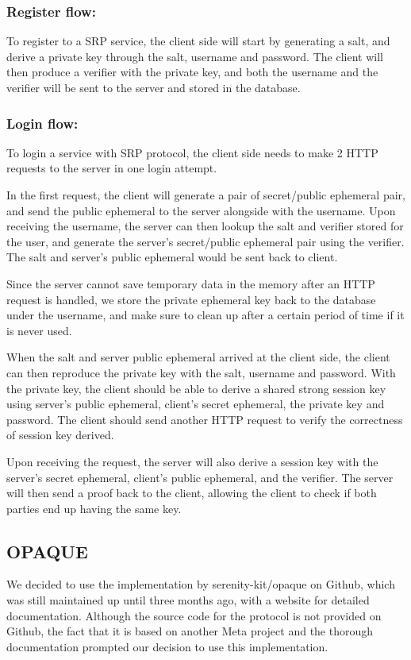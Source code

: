 \subsubsection{Register flow:}
To register to a SRP service, the client side will start by generating a salt, and derive a private key through the salt, username and password.
The client will then produce a verifier with the private key, and both the username and the verifier will be sent to the server and stored in the database.


\subsubsection{Login flow:}
To login a service with SRP protocol, the client side needs to make 2 HTTP requests to the server in one login attempt. 

In the first request, the client will generate a pair of secret/public ephemeral pair, and send the public ephemeral to the server alongside with the username.
Upon receiving the username, the server can then lookup the salt and verifier stored for the user, and generate the server's secret/public ephemeral pair using the verifier.
The salt and server's public ephemeral would be sent back to client.

Since the server cannot save temporary data in the memory after an HTTP request is handled, we store the private ephemeral key back to the database under the username, and make sure to clean up after a certain period of time if it is never used.

When the salt and server public ephemeral arrived at the client side, the client can then reproduce the private key with the salt, username and password.
With the private key, the client should be able to derive a shared strong session key using server's public ephemeral, client's secret ephemeral, the private key and password.
The client should send another HTTP request to verify the correctness of session key derived. 

Upon receiving the request, the server will also derive a session key with the server's secret ephemeral, client's public ephemeral, and the verifier.
The server will then send a proof back to the client, allowing the client to check if both parties end up having the same key.


\subsection{OPAQUE}
We decided to use the implementation by serenity-kit/opaque on Github, which was still maintained up until three months ago, with a website for detailed documentation.
Although the source code for the protocol is not provided on Github, the fact that it is based on another Meta project and the thorough documentation prompted our decision to use this implementation.

